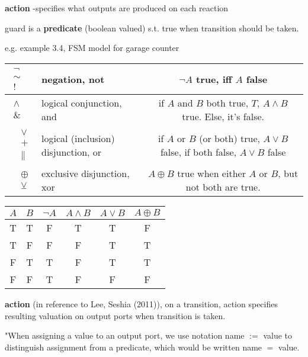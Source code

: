 \documentclass[10pt]{amsart}
\begin{document}
\begin{multicols*}{2}
\textbf{action} -specifies what outputs are produced on each reaction  


guard is a \textbf{predicate} (boolean valued) s.t. true when transition should be taken.  

e.g. example 3.4, FSM model for garage counter  

\begin{tabular}{l l c}
	$\begin{aligned}
	\neg \\ 
	\sim \\ 
	! 
	\end{aligned}$ & negation, not &  $\neg A$ true, iff $A$ false  \\ \hline
	$\begin{aligned}
	\wedge \\ \& \
	\end{aligned}$ & logical conjunction, and & if $A$ and $B$ both true, $T$, $A \wedge B$ true.  Else, it's false.    \\ \hline 
	$\begin{aligned}
	& \vee \\ & + \\ & \parallel \end{aligned}$ & logical (inclusion) disjunction, or & if $A$ or $B$ (or both) true, $A \vee B$ false, if both false, $A\vee B$ false  
	\\ \hline  
	$\begin{aligned}
	& \oplus \\ 
	& \veebar \end{aligned}$ & exclusive disjunction, xor & $A \oplus B$ true when either $A$ or $B$, but not both are true.    
\end{tabular}

\begin{tabular}{c c c c c c}
	\hline
	$A$ & $B$ & $\neg A$ & $ A\wedge B$ & $A \vee B$ & $A \oplus B$ \\ \hline
	T & T & F & T & T & F  \\
	T & F & F & F & T & T \\ 
	F & T & T & F & T & T \\ 
	F & F & T & F & F & F  
\end{tabular}


\textbf{action} (in reference to Lee, Seshia (2011)), on a transition, action specifies resulting valuation on output ports when transition is taken.  

"When assigning a value to an output port, we use notation name $:=$ value to distinguish assignment from a predicate, which would be written name $=$ value.  


\end{multicols*}
\end{document}
